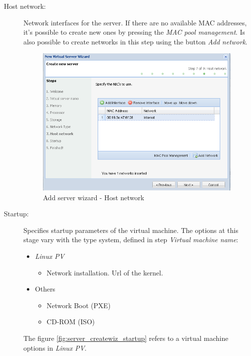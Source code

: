 \begin{description}
        
        \item[Host network:] Network interfaces for the server. If there are no available MAC addresses, it's possible to create new ones by pressing the \emph{MAC pool management}. Is also possible to create networks in this step using the button \emph{Add network}.
		\begin{figure}[H]
        		\begin{center}
	        	\includegraphics[scale=0.5]{screenshots/server_createwiz_hostnet.png}
	        	\caption{Add server wizard - Host network}
		        \label{fig:server_createwiz_hostnet}
        		\end{center}
		\end{figure}

        \item[Startup:] Specifies startup parameters of the virtual machine. The options at this stage vary with the type system, defined in step \emph{Virtual machine name}:		\label{sec:add_server_boot}
        \begin{itemize}
			\item \emph{Linux PV}
				\begin{itemize}
					\item Network installation. Url of the kernel.
				\end{itemize}
			\item Others
				\begin{itemize}
					\item Network Boot (PXE)
					\item CD-ROM (ISO)
				\end{itemize}
		\end{itemize}
        The figure \ref{fig:server_createwiz_startup} refers to a virtual machine options in \emph{Linux PV}.


\end{description}
